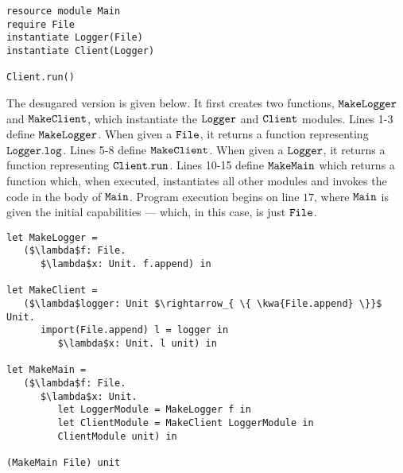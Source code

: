 \begin{lstlisting}
resource module Main
require File
instantiate Logger(File)
instantiate Client(Logger)

Client.run()
\end{lstlisting}

The desugared version is given below. It first creates two functions, $\mathtt{MakeLogger}$ and $\mathtt{MakeClient}$, which instantiate the $\mathtt{Logger}$ and $\mathtt{Client}$ modules. Lines 1-3 define $\mathtt{MakeLogger}$. When given a $\mathtt{File}$, it returns a function representing $\mathtt{Logger.log}$. Lines 5-8 define $\mathtt{MakeClient}$. When given a $\mathtt{Logger}$, it returns a function representing $\mathtt{Client.run}$. Lines 10-15 define $\mathtt{MakeMain}$ which returns a function which, when executed, instantiates all other modules and invokes the code in the body of $\mathtt{Main}$. Program execution begins on line $17$, where $\mathtt{Main}$ is given the initial capabilities --- which, in this case, is just $\mathtt{File}$.

\begin{lstlisting}
let MakeLogger =
   ($\lambda$f: File.
      $\lambda$x: Unit. f.append) in
          
let MakeClient =
   ($\lambda$logger: Unit $\rightarrow_{ \{ \kwa{File.append} \}}$ Unit.
      import(File.append) l = logger in
         $\lambda$x: Unit. l unit) in
          
let MakeMain =
   ($\lambda$f: File.
      $\lambda$x: Unit.
         let LoggerModule = MakeLogger f in
         let ClientModule = MakeClient LoggerModule in
         ClientModule unit) in

(MakeMain File) unit
\end{lstlisting}

